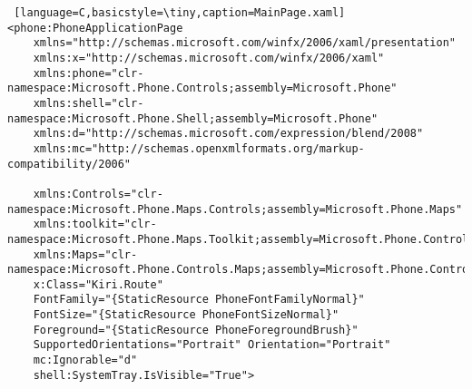 \begin{lstlisting} [language=C,basicstyle=\tiny,caption=MainPage.xaml]
<phone:PhoneApplicationPage
    xmlns="http://schemas.microsoft.com/winfx/2006/xaml/presentation"
    xmlns:x="http://schemas.microsoft.com/winfx/2006/xaml"
    xmlns:phone="clr-namespace:Microsoft.Phone.Controls;assembly=Microsoft.Phone"
    xmlns:shell="clr-namespace:Microsoft.Phone.Shell;assembly=Microsoft.Phone"
    xmlns:d="http://schemas.microsoft.com/expression/blend/2008"
    xmlns:mc="http://schemas.openxmlformats.org/markup-compatibility/2006"
    
    xmlns:Controls="clr-namespace:Microsoft.Phone.Maps.Controls;assembly=Microsoft.Phone.Maps"
    xmlns:toolkit="clr-namespace:Microsoft.Phone.Maps.Toolkit;assembly=Microsoft.Phone.Controls.Toolkit"
    xmlns:Maps="clr-namespace:Microsoft.Phone.Controls.Maps;assembly=Microsoft.Phone.Controls.Maps"
    x:Class="Kiri.Route"
    FontFamily="{StaticResource PhoneFontFamilyNormal}"
    FontSize="{StaticResource PhoneFontSizeNormal}"
    Foreground="{StaticResource PhoneForegroundBrush}"
    SupportedOrientations="Portrait" Orientation="Portrait"
    mc:Ignorable="d"
    shell:SystemTray.IsVisible="True">


\end{lstlisting}
